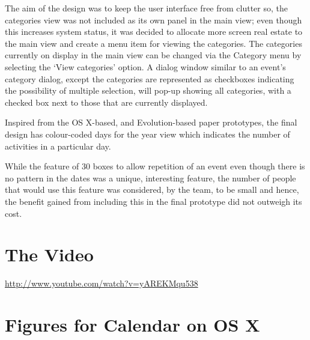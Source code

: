 \documentclass{article}
\begin{document}
The aim of the design was to keep the user interface free from clutter
so, the categories view was not included as its own panel in the main
view; even though this increases system status, it was decided to
allocate more screen real estate to the main view and create a menu
item for viewing the categories. The categories currently on display
in the main view can be changed via the Category menu by selecting
the `View categories' option. A dialog window similar to an event's
category dialog, except the categories are represented as checkboxes
indicating the possibility of multiple selection, will pop-up showing
all categories, with a checked box next to those that are currently
displayed.

Inspired from the OS X-based, and Evolution-based paper prototypes, the
final design has colour-coded days for the year view which indicates
the number of activities in a particular day.

While the feature of 30 boxes to allow repetition of an event even
though there is no pattern in the dates was a unique, interesting
feature, the number of people that would use this feature was
considered, by the team, to be small and hence, the benefit gained
from including this in the final prototype did not outweigh its cost.


\section{The Video}

\url{http://www.youtube.com/watch?v=yAREKMqu538}

\pagebreak


\appendix

\section{Figures for Calendar on OS X}
\end{document}
